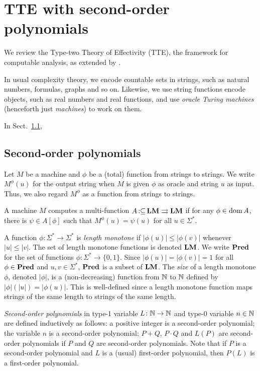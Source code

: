 \documentclass[envcountsame,orivec,oribibl]{llncs}
\newcommand{\pcolon}{\mathpunct{\,:\subseteq}}
\begin{document}
\section{TTE with second-order polynomials}
\label{section: computable analysis}

We review the Type-two Theory of Effectivity (TTE), 
the framework for computable analysis, 
as extended by 
\cite{kawamura2012complexity}. 

In usual complexity theory, we encode countable sets in strings, such as
natural numbers, formulas, graphs and so on. 
Likewise, 
we use string functions encode objects, such as real numbers and real functions, 
and use \emph{oracle Turing machines} (henceforth just \emph{machines}) 
to work on them.

In Sect.~\ref{section:TTF}, 

\subsection{Second-order polynomials}
\label{section:TTF}

Let $M$ be a machine and $\phi$ be a (total) function from strings to strings. 
We write $M ^\phi (u)$ for the output string 
when $M$ is given
$\phi$ as oracle and string $u$ as input.
Thus, we also regard $M^\phi$ as a function from strings to strings.

\begin{definition}
 A machine $M$ computes a multi-function $A \pcolon \LM \rightrightarrows \LM$ if for any
 $\phi \in \mathop{\rm dom} A$, there is $\psi \in A[\phi]$ such that $M^\phi(u) = \psi(u)$ for all $u \in \Sigma^*$.
\end{definition}

A function $\phi \colon \Sigma^* \to \Sigma^*$ is \emph{length monotone}
if  $|\phi(u)| \le |\phi(v)|$ whenever $|u| \le |v|$.
The set of length monotone functions is denoted $\mathbf{LM}$.
We write $\mathbf{Pred}$ for the set of functions $\phi \colon \Sigma^* \to \{0, 1\}$.
Since $|\phi(u)| = |\phi(v)| = 1$ for all $\phi \in \mathbf{Pred}$ and $u, v \in \Sigma^*$,
$\mathbf{Pred}$ is a subset of $\mathbf{LM}$.
The \emph{size} of a length monotone $\phi$, denoted $|\phi|$,
is a (non-decreasing) function from $\mathbb N$ to $\mathbb N$ defined by 
$|\phi|(|u|) = |\phi(u)|$.
This is well-defined since a length monotone function maps 
strings of the same length to strings of the same length.

\emph{Second-order polynomials} in type-1 variable $L \colon \mathbb N \to \mathbb N$
and type-0 variable $n \in \mathbb N$ 
are defined inductively as follows:
a positive integer is a second-order polynomial;
the variable $n$ is a second-order polynomial;
$P+Q$, $P \cdot Q$ and $L(P)$ are
second-order polynomials if $P$ and $Q$ are second-order polynomials.
Note that if $P$ is a second-order polynomial and $L$ is a (usual) first-order
polynomial, then $P(L)$ is a first-order polynomial.
\end{document}
